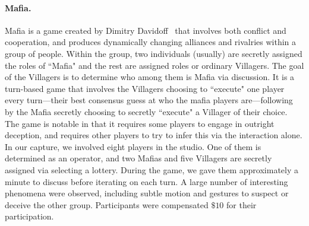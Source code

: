 \paragraph{Mafia.} Mafia is a game created by Dimitry Davidoff~\cite{Haffner-99} that involves both conflict and cooperation, and produces dynamically changing alliances and rivalries within a group of people. Within the group, two individuals (usually) are secretly assigned the roles of ``Mafia" and the rest are assigned roles or ordinary Villagers. The goal of the Villagers is to determine who among them is Mafia via discussion. It is a turn-based game that involves the Villagers choosing to ``execute" one player every turn---their best consensus guess at who the mafia players are---following by the Mafia secretly choosing to secretly ``execute" a Villager of their choice. The game is notable in that it requires some players to engage in outright deception, and requires other players to try to infer this via the interaction alone. In our capture, we involved eight players in the studio. One of them is determined as an operator, and two Mafias and five Villagers are secretly assigned via selecting a lottery.  During the game, we gave them approximately a minute to discuss before iterating on each turn. A large number of interesting phenomena were observed, including subtle motion and gestures to suspect or deceive the other group. Participants were compensated $\$10$ for their participation.

